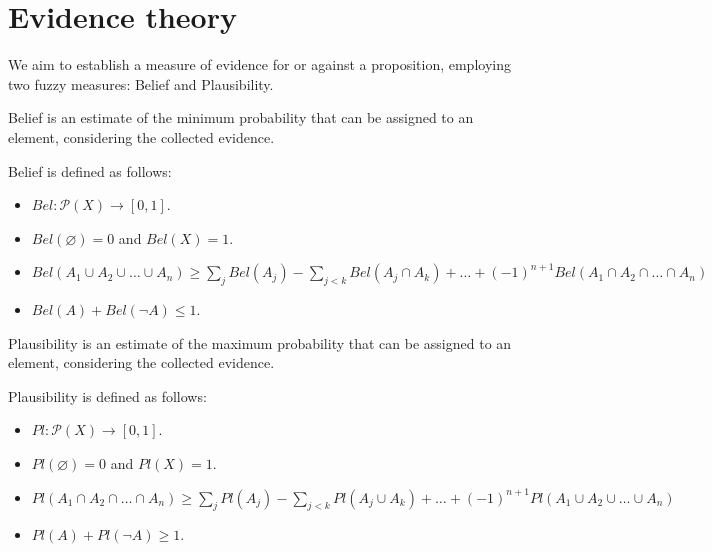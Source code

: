 \section{Evidence theory}

We aim to establish a measure of evidence for or against a proposition, employing two fuzzy measures: Belief and Plausibility.
\begin{definition}
    Belief is an estimate of the minimum probability that can be assigned to an element, considering the collected evidence.
\end{definition}
Belief is defined as follows:
\begin{itemize}
    \item $Bel:\mathcal{P} (X) \rightarrow [0,1]$.
    \item $Bel(\varnothing)=0$ and $Bel(X)=1$.
    \item $Bel(A_1 \cup A_2 \cup \dots \cup A_n) \geq \sum_{j}Bel(A_j)-\sum_{j<k}Bel(A_j \cap A_k)+\dots+(-1)^{n+1}Bel(A_1 \cap A_2 \cap \dots \cap A_n)$
    \item $Bel(A)+Bel(\lnot A) \leq 1$.
\end{itemize}
\begin{definition}
    Plausibility is an estimate of the maximum probability that can be assigned to an element, considering the collected evidence. 
\end{definition} 
Plausibility is defined as follows:
\begin{itemize}
    \item $Pl:\mathcal{P} (X) \rightarrow [0,1]$.
    \item $Pl(\varnothing)=0$ and $Pl(X)=1$.
    \item $Pl(A_1 \cap A_2 \cap \dots \cap A_n) \geq \sum_{j}Pl(A_j)-\sum_{j<k}Pl(A_j \cup A_k)+\dots+(-1)^{n+1}Pl(A_1 \cup A_2 \cup \dots \cup A_n)$
    \item $Pl(A)+Pl(\lnot A) \geq 1$.
\end{itemize}

